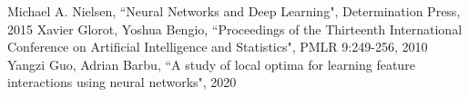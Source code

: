 \documentclass{article}
\begin{document}
\begin{thebibliography}{10}
 Michael A. Nielsen, ``Neural Networks and Deep Learning", Determination Press, 2015
Xavier Glorot, Yoshua Bengio, ``Proceedings of the Thirteenth International Conference on Artificial Intelligence and Statistics", PMLR 9:249-256, 2010
  Yangzi Guo, Adrian Barbu, ``A study of local optima for learning feature interactions using neural networks", 2020

\end{thebibliography}
\end{document}
